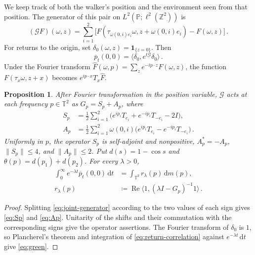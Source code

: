 \documentclass[11pt]{amsart}
\theoremstyle{plain}
\newtheorem{proposition}[theorem]{Proposition}
\theoremstyle{definition}
\newcommand{\Z}{\mathbb Z}
\newcommand{\T}{\mathbb T}
\renewcommand{\P}{\mathbb P}
\newcommand{\1}{\mathbf 1}
\newcommand{\ip}[2]{\langle #1,#2\rangle}
\newcommand{\norm}[1]{\lVert #1\rVert}
\newcommand{\dd}{\,\mathrm d}
\begin{document}
We keep track of both the walker's position and the environment seen
from that position.  The generator of this pair on
$L^2(\P;\ell^2(\Z^2))$ is
\begin{equation}\label{eq:joint-generator}
  (\mathcal GF)(\omega,z)=\sum_{i=1}^2
  \bigl[F(\tau_{\omega(0,i)e_i}\omega,z+\omega(0,i)e_i)-F(\omega,z)\bigr]\, .
\end{equation}
For returns to the origin, set
$\delta_0(\omega,z)=\1_{\{z=0\}}$.  Then
\begin{equation}\label{eq:return-correlation}
  \overline p_t(0,0)=\ip{\delta_0}{e^{t\mathcal G}\delta_0}\, .
\end{equation}
Under the Fourier transform
$\widehat F(\omega,p)=\sum_z e^{-ip\cdot z}F(\omega,z)$, the function
$F(\tau_x\omega,z+x)$ becomes $e^{ip\cdot x}T_x\widehat F$.

\begin{proposition}\label{prop:generator}
After Fourier transformation in the position variable, $\mathcal G$ acts
at each frequency $p\in\T^2$ as $G_p=S_p+A_p$, where
\begin{align}
  S_p&=\frac12\sum_{i=1}^2
  \bigl(e^{ip_i}T_{e_i}+e^{-ip_i}T_{-e_i}-2I\bigr),\label{eq:Sp}\\
  A_p&=\frac12\sum_{i=1}^2\omega(0,i)
  \bigl(e^{ip_i}T_{e_i}-e^{-ip_i}T_{-e_i}\bigr)\, .\label{eq:Ap}
\end{align}
Uniformly in $p$, the operator $S_p$ is self-adjoint and nonpositive,
$A_p^*=-A_p$, $\norm{S_p}\leq4$, and $\norm{A_p}\leq2$.
Put $d(s)=1-\cos s$ and $\theta(p)=d(p_1)+d(p_2)$.
For every $\lambda>0$,
\begin{align}
  \int_0^\infty e^{-\lambda t}\overline p_t(0,0)\dd t
  &=\int_{\T^2}r_\lambda(p)\dd m(p),\label{eq:green}\\
  r_\lambda(p)&\coloneqq
  \operatorname{Re}\ip1{(\lambda I-G_p)^{-1}1}\, .\label{eq:frequency-resolvent}
\end{align}
\end{proposition}

\begin{proof}
Splitting \eqref{eq:joint-generator} according to the two values of each
sign gives \eqref{eq:Sp} and \eqref{eq:Ap}.  Unitarity of the shifts and
their commutation with the corresponding signs give the operator
assertions.  The Fourier transform of $\delta_0$ is $1$, so Plancherel's
theorem and integration of \eqref{eq:return-correlation} against
$e^{-\lambda t}\dd t$ give \eqref{eq:green}.
\end{proof}
\end{document}
